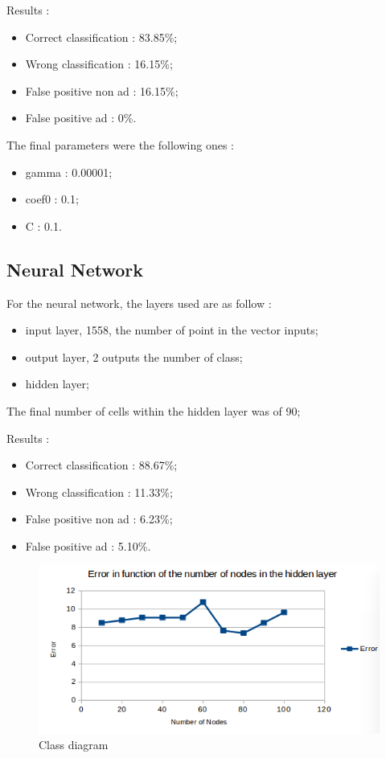 Results :
\begin{itemize}
  \item Correct classification : 83.85\%;
  \item Wrong classification : 16.15\%;
  \item False positive non ad : 16.15\%;
  \item False positive ad : 0\%.
\end{itemize}

The final parameters were the following ones :
\begin{itemize}
  \item gamma : 0.00001;
  \item coef0 : 0.1;
  \item C : 0.1.
\end{itemize}

\subsection{Neural Network}
For the neural network, the layers used are as follow :
  \begin{itemize}
    \item input layer, 1558, the number of point in the vector inputs;
    \item output layer, 2 outputs the number of class;
    \item hidden layer;
  \end{itemize}

The final number of cells within the hidden layer was of 90;

  Results :
  \begin{itemize}
    \item Correct classification : 88.67\%;
    \item Wrong classification : 11.33\%;
    \item False positive non ad : 6.23\%;
    \item False positive ad : 5.10\%.
  \end{itemize}

  \begin{figure}[h]
   \centering
   \includegraphics[scale=0.5]{../images/NNPO.png}
   \caption{Class diagram}
  \end{figure}


